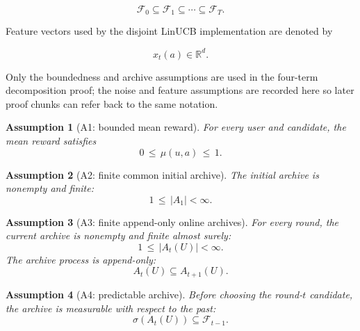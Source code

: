 \documentclass{article} %
\newtheorem{assumption}{Assumption}
\begin{document}
\begin{equation}
\label{eq:app-filtration}
\mathcal{F}_0 \subseteq \mathcal{F}_1 \subseteq \cdots \subseteq \mathcal{F}_T.
\end{equation}

Feature vectors used by the disjoint LinUCB implementation are denoted by

\begin{equation}
\label{eq:app-feature-vector}
x_t(a)\in\mathbb{R}^{d}.
\end{equation}

Only the boundedness and archive assumptions are used in the four-term decomposition proof; the noise and feature assumptions are recorded here so later proof chunks can refer back to the same notation.

\begin{assumption}[A1: bounded mean reward]
\label{ass:app-bounded}
For every user and candidate, the mean reward satisfies
\begin{equation}
\label{eq:app-ass-bounded}
0 \,\le\, \mu(u,a) \,\le\, 1.
\end{equation}
\end{assumption}

\begin{assumption}[A2: finite common initial archive]
\label{ass:app-finite-initial}
The initial archive is nonempty and finite:
\begin{equation}
\label{eq:app-ass-initial-finite}
1 \,\le\, |A_1| < \infty.
\end{equation}
\end{assumption}

\begin{assumption}[A3: finite append-only online archives]
\label{ass:app-append-only}
For every round, the current archive is nonempty and finite almost surely:
\begin{equation}
\label{eq:app-ass-current-finite}
1 \,\le\, |A_t(U)| < \infty.
\end{equation}
The archive process is append-only:
\begin{equation}
\label{eq:app-ass-append-only}
A_t(U)\subseteq A_{t+1}(U).
\end{equation}
\end{assumption}

\begin{assumption}[A4: predictable archive]
\label{ass:app-predictable}
Before choosing the round-\(t\) candidate, the archive is measurable with respect to the past:
\begin{equation}
\label{eq:app-ass-predictable}
\sigma(A_t(U)) \subseteq \mathcal{F}_{t-1}.
\end{equation}
\end{assumption}
\end{document}
